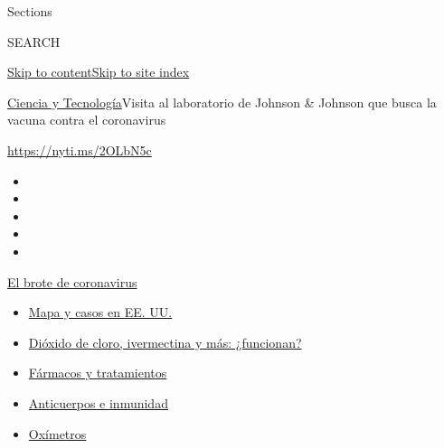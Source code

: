 Sections

SEARCH

\protect\hyperlink{site-content}{Skip to
content}\protect\hyperlink{site-index}{Skip to site index}

\href{/es/section/ciencia-y-tecnologia}{Ciencia y
Tecnología}\textbar{}Visita al laboratorio de Johnson \& Johnson que
busca la vacuna contra el coronavirus

\url{https://nyti.ms/2OLbN5c}

\begin{itemize}
\item
\item
\item
\item
\item
\end{itemize}

\href{https://www.nytimes.com/es/spotlight/coronavirus?action=click\&pgtype=Article\&state=default\&region=TOP_BANNER\&context=storylines_menu}{El
brote de coronavirus}

\begin{itemize}
\tightlist
\item
  \href{https://www.nytimes.com/es/interactive/2020/espanol/mundo/coronavirus-en-estados-unidos.html?action=click\&pgtype=Article\&state=default\&region=TOP_BANNER\&context=storylines_menu}{Mapa
  y casos en EE. UU.}
\item
  \href{https://www.nytimes.com/es/2020/07/23/espanol/america-latina/bolivia-cloro-coronavirus-ivermectina.html?action=click\&pgtype=Article\&state=default\&region=TOP_BANNER\&context=storylines_menu}{Dióxido
  de cloro, ivermectina y más: ¿funcionan?}
\item
  \href{https://www.nytimes.com/es/interactive/2020/science/coronavirus-tratamientos-curas.html?action=click\&pgtype=Article\&state=default\&region=TOP_BANNER\&context=storylines_menu}{Fármacos
  y tratamientos}
\item
  \href{https://www.nytimes.com/es/2020/07/28/espanol/ciencia-y-tecnologia/anticuerpos-coronavirus-inmunidad.html?action=click\&pgtype=Article\&state=default\&region=TOP_BANNER\&context=storylines_menu}{Anticuerpos
  e inmunidad}
\item
  \href{https://www.nytimes.com/es/2020/04/29/espanol/estilos-de-vida/oximetro-para-que-sirve.html?action=click\&pgtype=Article\&state=default\&region=TOP_BANNER\&context=storylines_menu}{Oxímetros}
\end{itemize}

